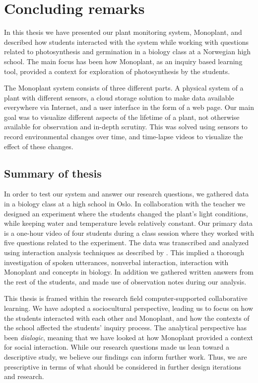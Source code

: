 \chapter{Concluding remarks}
In this thesis we have presented our plant monitoring system, Monoplant, and described how students interacted with the system while working with questions related to photosynthesis and germination in a biology class at a Norwegian high school. The main focus has been how Monoplant, as an inquiry based learning tool, provided a context for exploration of photosynthesis by the students. 

The Monoplant system consists of three different parts. A physical system of a plant with different sensors, a cloud storage solution to make data available everywhere via Internet, and a user interface in the form of a web page. Our main goal was to visualize different aspects of the lifetime of a plant, not otherwise available for observation and in-depth scrutiny. This was solved using sensors to record environmental changes over time, and time-lapse videos to visualize the effect of these changes. 

\section{Summary of thesis}
In order to test our system and answer our research questions, we gathered data in a biology class at a high school in Oslo. In collaboration with the teacher we designed an experiment where the students changed the plant's light conditions, while keeping water and temperature levels relatively constant. Our primary data is a one-hour video of four students during a class session where they worked with five questions related to the experiment. The data was transcribed and analyzed using interaction analysis techniques as described by \citet{jordan1995interaction}. This implied a thorough investigation of spoken utterances, nonverbal interaction, interaction with Monoplant and concepts in biology. In addition we gathered written answers from the rest of the students, and made use of observation notes during our analysis. 

This thesis is framed within the research field computer-supported collaborative learning. We have adopted a sociocultural perspective, leading us to focus on how the students interacted with each other and Monoplant, and how the contexts of the school affected the students' inquiry process. The analytical perspective has been \emph{dialogic}, meaning that we have looked at how Monoplant provided a context for social interaction. While our research questions made us lean toward a descriptive study, we believe our findings can inform further work. Thus, we are prescriptive in terms of what should be considered in further design iterations and research.


